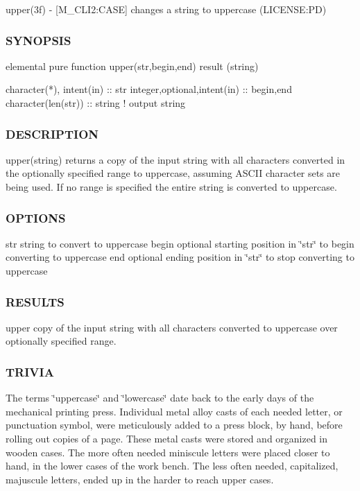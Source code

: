 upper(3f) -\/ \mbox{[}M\+\_\+\+C\+L\+I2\+:C\+A\+SE\mbox{]} changes a string to uppercase (L\+I\+C\+E\+N\+SE\+:PD) 

\subsubsection*{S\+Y\+N\+O\+P\+S\+IS}

\begin{DoxyVerb}elemental pure function upper(str,begin,end) result (string)

 character(*), intent(in)    :: str
 integer,optional,intent(in) :: begin,end
 character(len(str))         :: string  ! output string
\end{DoxyVerb}
 \subsubsection*{D\+E\+S\+C\+R\+I\+P\+T\+I\+ON}

upper(string) returns a copy of the input string with all characters converted in the optionally specified range to uppercase, assuming A\+S\+C\+II character sets are being used. If no range is specified the entire string is converted to uppercase.

\subsubsection*{O\+P\+T\+I\+O\+NS}

str string to convert to uppercase begin optional starting position in \char`\"{}str\char`\"{} to begin converting to uppercase end optional ending position in \char`\"{}str\char`\"{} to stop converting to uppercase

\subsubsection*{R\+E\+S\+U\+L\+TS}

upper copy of the input string with all characters converted to uppercase over optionally specified range.

\subsubsection*{T\+R\+I\+V\+IA}

The terms \char`\"{}uppercase\char`\"{} and \char`\"{}lowercase\char`\"{} date back to the early days of the mechanical printing press. Individual metal alloy casts of each needed letter, or punctuation symbol, were meticulously added to a press block, by hand, before rolling out copies of a page. These metal casts were stored and organized in wooden cases. The more often needed miniscule letters were placed closer to hand, in the lower cases of the work bench. The less often needed, capitalized, majuscule letters, ended up in the harder to reach upper cases.

